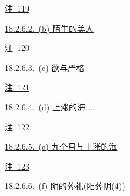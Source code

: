 \par\noindent\hspace*{4.05em}\hyperref[ch18:local:n23]{注~119}\nobreak\dotfill\nobreak\hyperref[ch18:local:n23]{\pageref*{ch18:local:n23}}\par
\par\noindent\hspace*{2.70em}\hyperref[ch18:local:h28]{18.2.6.2.~(b) 陌生的美人}\nobreak\dotfill\nobreak\hyperref[ch18:local:h28]{\pageref*{ch18:local:h28}}\par
\par\noindent\hspace*{4.05em}\hyperref[ch18:local:n24]{注~120}\nobreak\dotfill\nobreak\hyperref[ch18:local:n24]{\pageref*{ch18:local:n24}}\par
\par\noindent\hspace*{2.70em}\hyperref[ch18:local:h29]{18.2.6.3.~(c) 欲与严格}\nobreak\dotfill\nobreak\hyperref[ch18:local:h29]{\pageref*{ch18:local:h29}}\par
\par\noindent\hspace*{4.05em}\hyperref[ch18:local:n25]{注~121}\nobreak\dotfill\nobreak\hyperref[ch18:local:n25]{\pageref*{ch18:local:n25}}\par
\par\noindent\hspace*{2.70em}\hyperref[ch18:local:h30]{18.2.6.4.~(d) 上涨的海……}\nobreak\dotfill\nobreak\hyperref[ch18:local:h30]{\pageref*{ch18:local:h30}}\par
\par\noindent\hspace*{4.05em}\hyperref[ch18:local:n26]{注~122}\nobreak\dotfill\nobreak\hyperref[ch18:local:n26]{\pageref*{ch18:local:n26}}\par
\par\noindent\hspace*{2.70em}\hyperref[ch18:local:h31]{18.2.6.5.~(e) 九个月与上涨的海}\nobreak\dotfill\nobreak\hyperref[ch18:local:h31]{\pageref*{ch18:local:h31}}\par
\par\noindent\hspace*{4.05em}\hyperref[ch18:local:n27]{注~123}\nobreak\dotfill\nobreak\hyperref[ch18:local:n27]{\pageref*{ch18:local:n27}}\par
\par\noindent\hspace*{2.70em}\hyperref[ch18:local:h32]{18.2.6.6.~(f) 阴的葬礼(阳葬阴(4))}\nobreak\dotfill\nobreak\hyperref[ch18:local:h32]{\pageref*{ch18:local:h32}}\par
